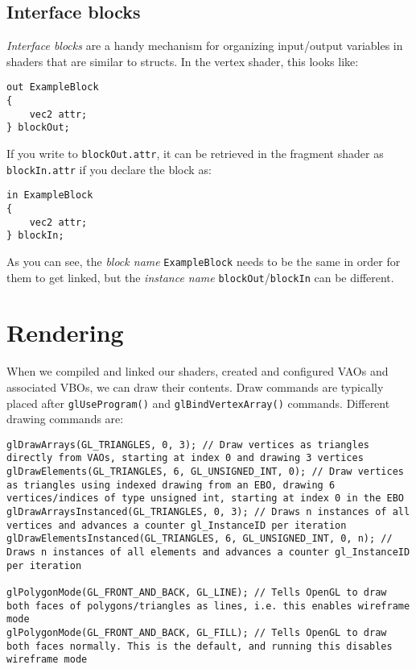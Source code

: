 \documentclass[8pt, table, xcdraw]{article}%
\begin{document}
\subsection{Interface blocks} \label{interface_block}

\emph{Interface blocks} are a handy mechanism for organizing input/output variables in shaders that are similar to structs. In the vertex shader, this looks like:

\begin{lstlisting}
out ExampleBlock
{
    vec2 attr;
} blockOut;
\end{lstlisting}

If you write to \lstinline{blockOut.attr}, it can be retrieved in the fragment shader as \lstinline{blockIn.attr} if you declare the block as:

\begin{lstlisting}
in ExampleBlock
{
    vec2 attr;
} blockIn;
\end{lstlisting}

As you can see, the \emph{block name} \lstinline{ExampleBlock} needs to be the same in order for them to get linked, but the \emph{instance name} \lstinline{blockOut}/\lstinline{blockIn} can be different.

\section{Rendering}

When we compiled and linked our shaders, created and configured VAOs and associated VBOs, we can draw their contents. Draw commands are typically placed after \lstinline{glUseProgram()} and \lstinline{glBindVertexArray()} commands. Different drawing commands are:

\begin{lstlisting}
glDrawArrays(GL_TRIANGLES, 0, 3); // Draw vertices as triangles directly from VAOs, starting at index 0 and drawing 3 vertices
glDrawElements(GL_TRIANGLES, 6, GL_UNSIGNED_INT, 0); // Draw vertices as triangles using indexed drawing from an EBO, drawing 6 vertices/indices of type unsigned int, starting at index 0 in the EBO
glDrawArraysInstanced(GL_TRIANGLES, 0, 3); // Draws n instances of all vertices and advances a counter gl_InstanceID per iteration
glDrawElementsInstanced(GL_TRIANGLES, 6, GL_UNSIGNED_INT, 0, n); // Draws n instances of all elements and advances a counter gl_InstanceID per iteration

glPolygonMode(GL_FRONT_AND_BACK, GL_LINE); // Tells OpenGL to draw both faces of polygons/triangles as lines, i.e. this enables wireframe mode
glPolygonMode(GL_FRONT_AND_BACK, GL_FILL); // Tells OpenGL to draw both faces normally. This is the default, and running this disables wireframe mode
\end{lstlisting}
\end{document}
